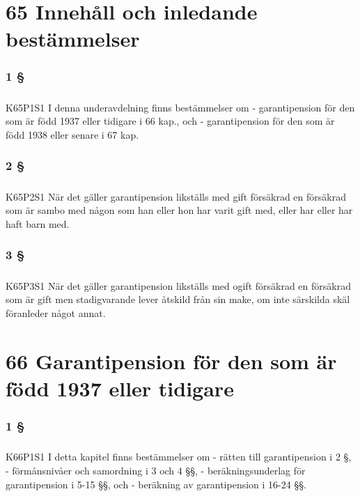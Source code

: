 \documentclass[a4paper,notitlepage,openany,10pt]{book}
\begin{document}
\chapter*{65 Innehåll och inledande bestämmelser}
\subsection*{1 §}
\paragraph*{}
{\tiny K65P1S1}
I denna underavdelning finns bestämmelser om
\newline - garantipension för den som är född 1937 eller tidigare i 66 kap., och
\newline - garantipension för den som är född 1938 eller senare i 67 kap.
\subsection*{2 §}
\paragraph*{}
{\tiny K65P2S1}
När det gäller garantipension likställs med gift försäkrad en försäkrad som är sambo med någon som han eller hon har varit gift med, eller har eller har haft barn med.
\subsection*{3 §}
\paragraph*{}
{\tiny K65P3S1}
När det gäller garantipension likställs med ogift försäkrad en försäkrad som är gift men stadigvarande lever åtskild från sin make, om inte särskilda skäl föranleder något annat.
\chapter*{66 Garantipension för den som är född 1937 eller tidigare}
\subsection*{1 §}
\paragraph*{}
{\tiny K66P1S1}
I detta kapitel finns bestämmelser om
\newline - rätten till garantipension i 2 §,
\newline - förmånsnivåer och samordning i 3 och 4 §§,
\newline - beräkningsunderlag för garantipension i 5-15 §§, och
\newline - beräkning av garantipension i 16-24 §§.
\end{document}
